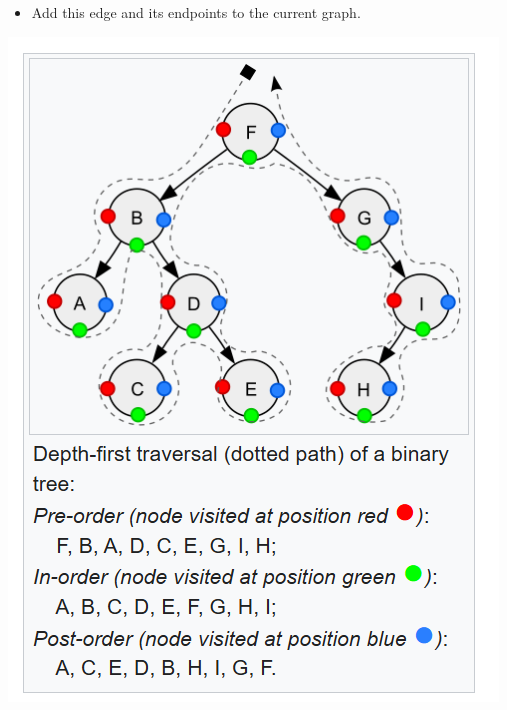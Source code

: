 \documentclass[10pt, portrait]{article}
\begin{document}
\begin{multicols*}{2}
\begin{itemize}
\begin{itemize}
        \item Add this edge and its endpoints to the current graph.
    \end{itemize}
    \begin{center}
        \includegraphics[width=0.5\linewidth]{dfs.png}
    \end{center}
\end{itemize}


\end{multicols*}
\end{document}
